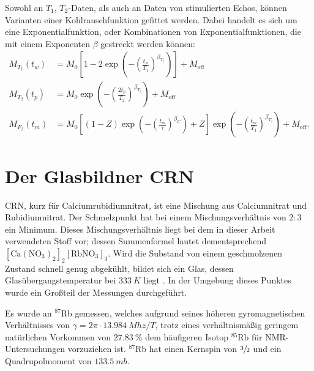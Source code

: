Sowohl an $T_1$, $T_2$-Daten, als auch an Daten von stimulierten Echos, können Varianten einer Kohlrauschfunktion gefittet werden. Dabei handelt es sich um eine Exponentialfunktion, oder Kombinationen von Exponentialfunktionen, die mit einem Exponenten $\beta$ gestreckt werden können:
\begin{align}
	M_{T_1} (t_w) & = M_0 \left[ 1 - 2 \exp{ \left(- { \left( \frac{t_w}{T_1} \right) }^{\beta_{T_1}} \right)} \right] + M_\text{off} \label{eqn:theo:T_1_fit}                                                                     \\
	M_{T_2} (t_p) & = M_0 \exp{ \left(- { \left( \frac{2 t_p}{T_2} \right) }^{\beta_{T_2}} \right)} + M_\text{off} \label{eqn:theo:T_2_fit}                                                                                        \\
	M_{F_2} (t_m) & = M_0 \left[  \left(1 - Z\right) \exp\left(- \left(\frac{t_m}{\tau}\right)^{\beta_C}\right) + Z \right] \exp\left(- \left(\frac{t_m}{T_1}\right)^{\beta_{T_1}}\right) + M_\text{off}. \label{eqn:theo:F_2_fit}
\end{align}



\section{Der Glasbildner CRN} \label{section:theo:crn}

CRN, kurz für Calciumrubidiumnitrat, ist eine Mischung aus Calciumnitrat und Rubidiumnitrat. Der Schmelzpunkt hat bei einem Mischungsverhältnis von $2 : 3$ ein Minimum. Dieses Mischungsverhältnis liegt bei dem in dieser Arbeit verwendeten Stoff vor; dessen Summenformel lautet dementsprechend $[\text{Ca}(\text{NO}_\text{3})_\text{2}]_\text{2}[\text{RbNO}_\text{3}]_\text{3}$. Wird die Substand von einem geschmolzenen Zustand schnell genug abgekühlt, bildet sich ein Glas, dessen Glasübergangstemperatur bei $\SI{333}{K}$ liegt \cite{PIMENOV199793}. In der Umgebung dieses Punktes wurde ein Großteil der Messungen durchgeführt.

Es wurde an $^\text{87}$Rb gemessen, welches aufgrund seines höheren gyromagnetischen Verhältnisses von $\gamma = 2\pi \cdot \SI{13.984}{Mhz / T}$, trotz eines verhältnismäßig geringem natürlichen Vorkommen von $\SI{27.83}{\percent}$ dem häufigeren Isotop $^\text{85}$Rb für NMR-Untersuchungen vorzuziehen ist. $^\text{87}$Rb hat einen Kernspin von $\sfrac{3}{2}$ und ein Quadrupolmoment von $\SI{133.5}{mb}$.
